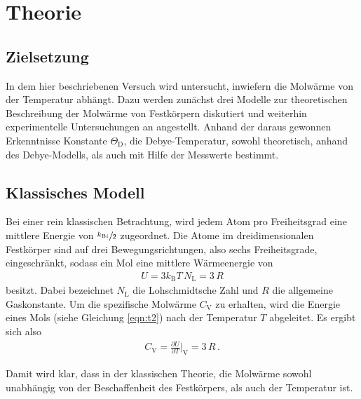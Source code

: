 \section{Theorie}
\label{sec:Theorie}

\subsection{Zielsetzung}
\label{subsec:zielsetzung}
In dem hier beschriebenen Versuch wird untersucht,
inwiefern die Molwärme von der Temperatur abhängt.
Dazu werden zunächst drei Modelle zur theoretischen Beschreibung
der Molwärme von Festkörpern diskutiert und weiterhin experimentelle
Untersuchungen an  angestellt.
Anhand der daraus gewonnen Erkenntnisse Konstante $\Theta_{\text{D}}$,
die Debye-Temperatur, sowohl theoretisch, anhand des Debye-Modells,
als auch mit Hilfe der Messwerte bestimmt.

\subsection{Klassisches Modell}
\label{subsec:klassisch}
Bei einer rein klassischen Betrachtung, wird jedem Atom pro Freiheitsgrad eine mittlere
Energie von $\sfrac{k_{\text{B}i}}{2}$ zugeordnet. Die Atome im dreidimensionalen
Festkörper sind auf drei Bewegungsrichtungen, also sechs Freiheitsgrade, eingeschränkt, sodass
ein Mol eine mittlere Wärmeenergie von
\begin{align}
	U = 3 k_{\text{B}} T \, N_{\text{L}} = 3 \, R \label{eqn:t2}
\end{align}
besitzt. Dabei bezeichnet $N_{\text{L}}$ die
Lohschmidtsche Zahl und
$R$ die allgemeine Gaskonstante.
Um die spezifische Molwärme $C_{\text{V}}$ zu erhalten,
wird die Energie eines Mols (siehe Gleichung \eqref{eqn:t2})
nach der Temperatur $T$ abgeleitet.
Es ergibt sich also
\begin{align}
	C_{\text{V}} = \frac{\partial U}{\partial T} \bigg\vert_{\text{V}} = 3 \, R \, . \label{eqn:t4}
\end{align}

Damit wird klar, dass in der klassischen Theorie,
die Molwärme sowohl unabhängig von der Beschaffenheit des
Festkörpers, als auch der Temperatur ist.


